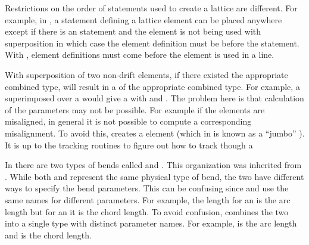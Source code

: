 \begin{description}
%
\item
Restrictions on the order of statements used to create a lattice are different. 
For example, in \bmad, a statement defining a lattice element can be placed anywhere
except if there is an  statement and the element is not being used
with superposition in which case the element definition must be before the 
statement. With \accellat, element definitions must come before the element is used in a line.
%
\item
With \bmad superposition of two non-drift elements, if there existed the appropriate
combined type, will result in a  of the appropriate combined type. For example,
a  superimposed over a  would give a   with
 and  . The problem here is that calculation of the
 parameters may not be possible. For example if the 
elements are misaligned, in general it is not possible to compute a corresponding 
misalignment. To avoid this, \accellat creates a   element
(which in \bmad is known as a ``jumbo'' ). It is up to the tracking routines to
figure out how to track though a 
%
\item
In  there are two types of bends called  and . 
This organization was inherited from . While both  and 
represent the same physical type of bend, the two have different ways to specify the bend parameters. 
This can be confusing since  and  use the same names for different parameters.
For example, the length  for an  is the arc length but for an  it is the
chord length. To avoid confusion, \accellat combines the two into a single  type with
distinct parameter names. For example,  is the arc length and  is the chord length.
\end{description}



